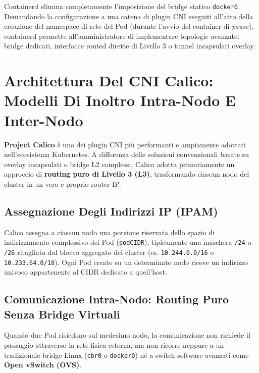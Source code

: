 \documentclass[11pt, a4paper]{article}
\begin{document}
Containerd elimina completamente l'imposizione del bridge statico \texttt{docker0}. Demandando la configurazione a una catena di plugin CNI eseguiti all'atto della creazione del namespace di rete del Pod (durante l'avvio del container di \emph{pause}), containerd permette all'amministratore di implementare topologie avanzate: bridge dedicati, interfacce routed dirette di Livello 3 o tunnel incapsulati overlay.

\newpage


\section{Architettura Del CNI Calico: Modelli Di Inoltro Intra-Nodo E Inter-Nodo}

\textbf{Project Calico} è uno dei plugin CNI più performanti e ampiamente adottati nell'ecosistema Kubernetes. A differenza delle soluzioni convenzionali basate su overlay incapsulati o bridge L2 complessi, Calico adotta primariamente un approccio di \textbf{routing puro di Livello 3 (L3)}, trasformando ciascun nodo del cluster in un vero e proprio router IP.

\subsection{Assegnazione Degli Indirizzi IP (IPAM)}
Calico assegna a ciascun nodo una porzione riservata dello spazio di indirizzamento complessivo dei Pod (\texttt{podCIDR}), tipicamente una maschera \texttt{/24} o \texttt{/26} ritagliata dal blocco aggregato del cluster (es. \texttt{10.244.0.0/16} o \texttt{10.233.64.0/18}). Ogni Pod creato su un determinato nodo riceve un indirizzo univoco appartenente al CIDR dedicato a quell'host.

\subsection{Comunicazione Intra-Nodo: Routing Puro Senza Bridge Virtuali}
Quando due Pod risiedono sul medesimo nodo, la comunicazione non richiede il passaggio attraverso la rete fisica esterna, ma non ricorre neppure a un tradizionale bridge Linux (\texttt{cbr0} o \texttt{docker0}) né a switch software avanzati come \textbf{Open vSwitch (OVS)}.
\end{document}
